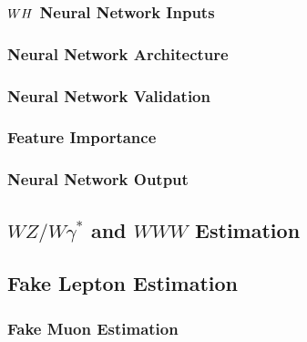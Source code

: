 \documentclass{umassthesis}          %
\begin{document}
\subsubsection{\texorpdfstring{$WH{}$}{WH} Neural Network Inputs}\label{sec:vh_wh_nn_inputs}

\subsubsection{Neural Network Architecture}\label{sec:vh_wh_nn_architecture}

\subsubsection{Neural Network Validation}\label{sec:vh_wh_nn_validation}

\subsubsection{Feature Importance}\label{sec:vh_wh_feature_importance}

\subsubsection{Neural Network Output}\label{sec:vh_wh_nn_output}

% 
\subsection{\texorpdfstring{$WZ/W\gamma^{*}$ and $WWW$}{WZ/Wgamma and WWW} Estimation}\label{sec:vh_wh_wz_www_control_regions}

\subsection{Fake Lepton Estimation}\label{sec:vh_wh_fake_lepton_estimation}

\subsubsection{Fake Muon Estimation}\label{sec:vh_wh_fake_muon_estimation}

\end{document}
